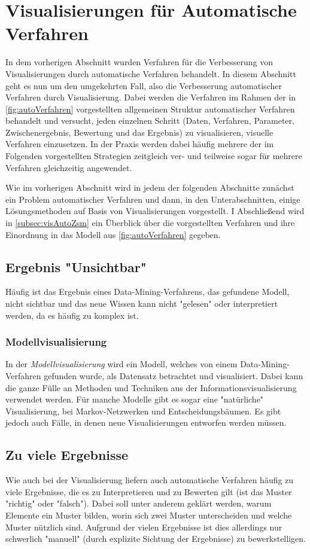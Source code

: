 	\section{Visualisierungen für Automatische Verfahren}
		In dem vorherigen Abschnitt wurden Verfahren für die Verbesserung von Visualisierungen durch automatische Verfahren behandelt. In diesem Abschnitt geht es nun um den umgekehrten Fall, also die Verbesserung automatischer Verfahren durch Visualisierung. Dabei werden die Verfahren im Rahmen der in \autoref{fig:autoVerfahren} vorgestellten allgemeinen Struktur automatischer Verfahren behandelt und versucht, jeden einzelnen Schritt (Daten, Verfahren, Parameter, Zwischenergebnis, Bewertung und das Ergebnis) zu visualisieren, \bzw visuelle Verfahren einzusetzen. In der Praxis werden dabei häufig mehrere der im Folgenden vorgestellten Strategien zeitgleich ver- und teilweise sogar für mehrere Verfahren gleichzeitig angewendet.

		Wie im vorherigen Abschnitt wird in jedem der folgenden Abschnitte zunächst ein Problem automatischer Verfahren und dann, in den Unterabschnitten, einige Lösungsmethoden auf Basis von Visualisierungen vorgestellt. I Abschließend wird in \autoref{subsec:visAutoZsm} ein Überblick über die vorgestellten Verfahren und ihre Einordnung in das Modell aus \autoref{fig:autoVerfahren} gegeben.

		\subsection{Ergebnis "Unsichtbar"}
			Häufig ist das Ergebnis eines Data-Mining-Verfahrens, das gefundene Modell, nicht sichtbar und das neue Wissen kann nicht "gelesen" oder interpretiert werden, da es häufig zu komplex ist.

			\subsubsection{Modellvisualisierung}
				In der \emph{Modellvisualisierung} wird ein Modell, welches von einem Data-Mining-Verfahren gefunden wurde, als Datensatz betrachtet und visualisiert. Dabei kann die ganze Fülle an Methoden und Techniken aus der Informationsvisualisierung verwendet werden. Für manche Modelle gibt es sogar eine "natürliche" Visualisierung, \zB bei Markov-Netzwerken und Entscheidungsbäumen. Es gibt jedoch auch Fälle, in denen neue Visualisierungen entworfen werden müssen.

		\subsection{Zu viele Ergebnisse}
			Wie auch bei der Visualisierung liefern auch automatische Verfahren häufig zu viele Ergebnisse, die es zu Interpretieren und zu Bewerten gilt (ist das Muster "richtig" oder "falsch"). Dabei soll unter anderem geklärt werden, warum Elemente ein Muster bilden, worin sich zwei Muster unterscheiden und welche Muster nützlich sind. Aufgrund der vielen Ergebnisse ist dies allerdings nur schwerlich "manuell" (durch explizite Sichtung der Ergebnisse) zu bewerkstelligen.

